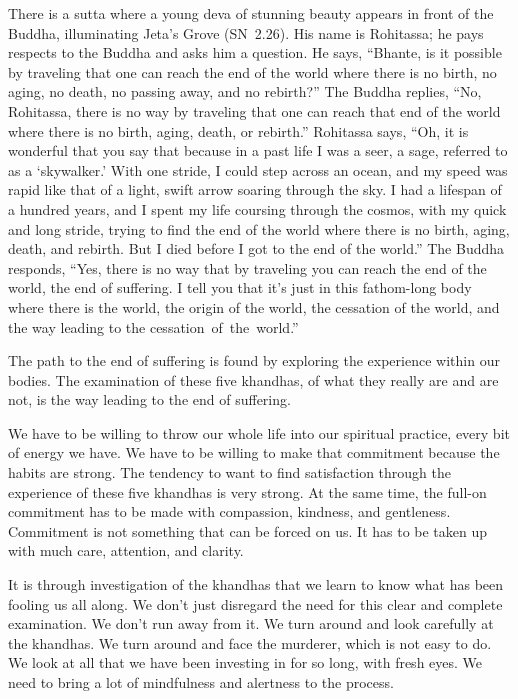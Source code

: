There is a sutta where a young deva of stunning beauty appears in front of the Buddha, illuminating Jeta's Grove \mbox{(SN 2.26)}. His name is Rohitassa; he pays respects to the Buddha and asks him a question. He says, ``Bhante, is it possible by traveling that one can reach the end of the world where there is no birth, no aging, no death, no passing away, and no rebirth?'' The Buddha replies, ``No, Rohitassa, there is no way by traveling that one can reach that end of the world where there is no birth, aging, death, or rebirth.'' Rohitassa says, ``Oh, it is wonderful that you say that because in a past life I was a seer, a sage, referred to as a `skywalker.' With one stride, I could step across an ocean, and my speed was rapid like that of a light, swift arrow soaring through the sky. I had a lifespan of a hundred years, and I spent my life coursing through the cosmos, with my quick and long stride, trying to find the end of the world where there is no birth, aging, death, and rebirth. But I died before I got to the end of the world.'' The Buddha responds, ``Yes, there is no way that by traveling you can reach the end of the world, the end of suffering. I tell you that it's just in this fathom-long body where there is the world, the origin of the world, the cessation of the world, and the way leading to the \mbox{cessation of the world.''}

The path to the end of suffering is found by exploring the experience within our bodies. The examination of these five khandhas, of what they really are and are not, is the way leading to the end of suffering.

We have to be willing to throw our whole life into our spiritual practice, every bit of energy we have. We have to be willing to make that commitment because the habits are strong. The tendency to want to find satisfaction through the experience of these five khandhas is very strong. At the same time, the full-on commitment has to be made with compassion, kindness, and gentleness. Commitment is not something that can be forced on us. It has to be taken up with much care, attention, and clarity.

\enlargethispage{1\baselineskip}
It is through investigation of the khandhas that we learn to know what has been fooling us all along. We don't just disregard the need for this clear and complete examination. We don't run away from it. We turn around and look carefully at the khandhas. We turn around and face the murderer, which is not easy to do. We look at all that we have been investing in for so long, with fresh eyes. We need to bring a lot of mindfulness and alertness to the process.

